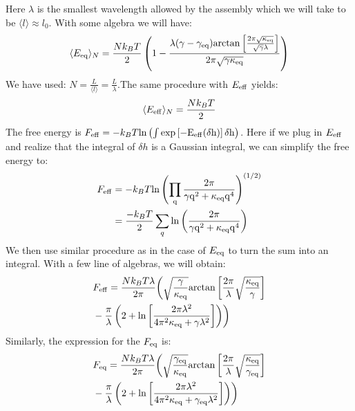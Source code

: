 \documentclass[amsmath,preprintnumbers,10pt,nofootinbib,prl,twocolumn]{revtex4-1}
\begin{document}
Here $\lambda$ is the smallest wavelength allowed by the assembly which we will take to be $\langle l \rangle \approx l_0$. With some algebra we will have:
\begin{equation}
    \langle E_{\rm eq}\rangle_N=\frac{N k_BT}{2}\left(1 - \frac{\lambda(\gamma-\gamma_{\rm eq})\rm{arctan}\left[\frac{2\pi\sqrt{\kappa_{\rm eq}}}{\sqrt{\gamma}\lambda}\right]}{2\pi\sqrt{\gamma\kappa_{\rm eq}}}\right)
\end{equation}
We have used: $N=\frac{L}{\langle l \rangle}=\frac{L}{ \lambda }$.The same procedure with $E_{\rm eff}$ yields:
\begin{equation}
    \langle E_{\rm eff}\rangle_N=\frac{N k_BT}{2}
\end{equation}
The free energy is $F_{\rm eff} = -k_BT\rm{ln}\left(\int \exp\left[-E_{\rm{eff}}(\delta h)\right]\delta h\right)$. Here if we plug in $E_{\rm eff}$ and realize that the integral of $\delta h$ is a Gaussian integral, we can simplify the free energy to:
\begin{equation}
\begin{split}
    F_{\rm eff}&= -k_BT\rm{ln}\left(\prod_q\frac{2\pi}{\gamma q^2+\kappa_{\rm eq} q^4}\right)^{(1/2)}\\
&=\frac{ -k_BT}{2}\sum_q\rm{ln}\left(\frac{2\pi}{\gamma q^2+\kappa_{\rm eq} q^4}\right)
\end{split}
\end{equation}
We then use similar procedure as in the case of $E_{\rm eq}$ to turn the sum into an integral. With a few line of algebras, we will obtain:
\begin{equation}
\begin{split}
     &F_{\rm eff}=\frac{N k_BT\lambda}{2\pi} \biggl(\sqrt{\frac{\gamma}{\kappa_{\rm eq}}}\rm{arctan}\left[\frac{2\pi}{\lambda}\sqrt{\frac{\kappa_{\rm eq}}{\gamma}}\right]\\
     &-\frac{\pi}{\lambda}\left(2+\rm{ln}\left[\frac{2\pi\lambda^2}{4\pi^2\kappa_{\rm eq}+\gamma\lambda^2}\right]\right)\biggr)
\end{split}
\end{equation}
Similarly, the expression for the $F_{\rm eq}$ is:
\begin{equation}
\begin{split}
     &F_{\rm eq}=\frac{N k_BT\lambda}{2\pi}\biggl(\sqrt{\frac{\gamma_{\rm eq}}{\kappa_{\rm eq}}}\rm{arctan}\left[\frac{2\pi}{\lambda}\sqrt{\frac{\kappa_{\rm eq}}{\gamma_{\rm eq}}}\right]\\
     &-\frac{\pi}{\lambda}\left(2+\rm{ln}\left[\frac{2\pi\lambda^2}{4\pi^2\kappa_{\rm eq}+\gamma_{\rm eq}\lambda^2}\right]\right)\biggr)
\end{split}
\end{equation}
\end{document}
